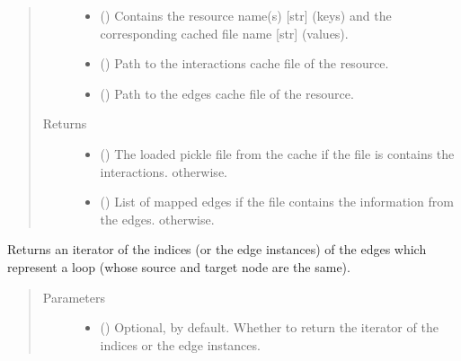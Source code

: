 \documentclass[letterpaper,10pt,english]{sphinxmanual}
\begin{document}
\begin{fulllineitems}
\begin{fulllineitems}
\begin{quote}
\begin{description}
\begin{itemize}
\item {} 
 () \textendash{} Contains the resource name(s) {[}str{]} (keys) and the
corresponding cached file name {[}str{]} (values).

\item {} 
 () \textendash{} Path to the interactions cache file of the resource.

\item {} 
 () \textendash{} Path to the edges cache file of the resource.

\end{itemize}

\item[{Returns}] \leavevmode
\begin{itemize}
\item {} 
() \textendash{} The loaded pickle file from the cache if the
file is contains the interactions.  otherwise.

\item {} 
() \textendash{} List of mapped edges if the file contains the
information from the edges. \sphinxcode{\sphinxupquote{{[}{]}}} otherwise.

\end{itemize}


\end{description}\end{quote}

\end{fulllineitems}


\begin{fulllineitems}
\label{\detokenize{reference:pypath.main.PyPath.loop_edges}}
Returns an iterator of the indices (or the edge instances) of
the edges which represent a loop (whose source and target node
are the same).
\begin{quote}\begin{description}
\item[{Parameters}] \leavevmode\begin{itemize}
\item {} 
 () \textendash{} Optional,  by default. Whether to return the
iterator of the indices or the edge instances.


\end{itemize}
\end{description}
\end{quote}
\end{fulllineitems}
\end{fulllineitems}
\end{document}
